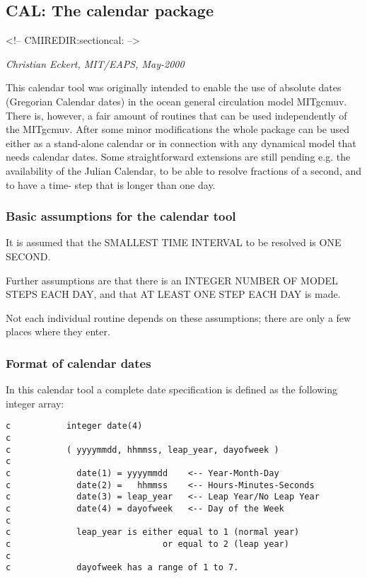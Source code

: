 \subsection{CAL: The calendar package
\label{sectioncal}}
\begin{rawhtml}
<!-- CMIREDIR:sectioncal: -->
\end{rawhtml}

\textit{Christian Eckert, MIT/EAPS, May-2000}

This calendar tool was originally intended to enable the use of
absolute dates (Gregorian Calendar dates) in the ocean general
circulation model MITgcmuv. There is, however, a fair amount of
routines that can be used independently of the MITgcmuv. After
some minor modifications the whole package can be used either
as a stand-alone calendar or in connection with any dynamical
model that needs calendar dates. Some straightforward extensions
are still pending e.g. the availability of the Julian Calendar,
to be able to resolve fractions of a second, and to have a time-
step that is longer than one day.

\subsubsection{Basic assumptions for the calendar tool}

    It is assumed that the SMALLEST TIME INTERVAL to be resolved is
    ONE SECOND.

    Further assumptions are that there is an INTEGER NUMBER OF
    MODEL STEPS EACH DAY, and that AT LEAST ONE STEP EACH DAY is
    made.

    Not each individual routine depends on these assumptions; there
    are only a few places where they enter.

\subsubsection{Format of calendar dates}

    In this calendar tool a complete date specification is defined
    as the following integer array:

\begin{verbatim}
c           integer date(4)
c
c           ( yyyymmdd, hhmmss, leap_year, dayofweek )
c
c             date(1) = yyyymmdd    <-- Year-Month-Day
c             date(2) =   hhmmss    <-- Hours-Minutes-Seconds
c             date(3) = leap_year   <-- Leap Year/No Leap Year
c             date(4) = dayofweek   <-- Day of the Week
c
c             leap_year is either equal to 1 (normal year)
c                              or equal to 2 (leap year)
c
c             dayofweek has a range of 1 to 7.
\end{verbatim}

